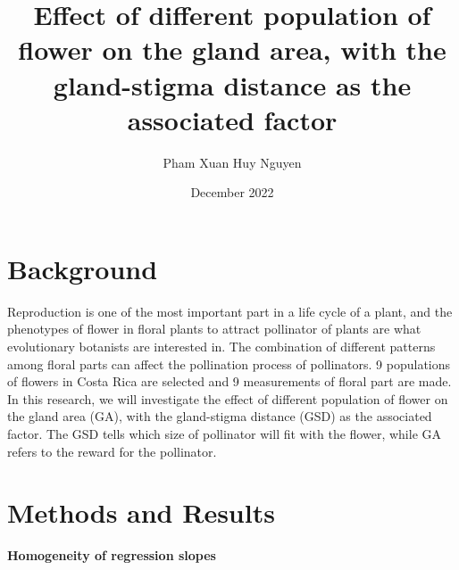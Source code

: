 \documentclass{article}
\title{Effect of different population of flower on the gland area, with the gland-stigma distance as the associated factor  }
\author{Pham Xuan Huy Nguyen}
\date{December 2022}
\begin{document}
\maketitle

\section{Background}

Reproduction is one of the most important part in a life cycle of a plant, and the phenotypes of flower in floral plants to attract pollinator of plants are what evolutionary botanists are interested in. The combination of different patterns among floral parts can affect the pollination process of pollinators. 9 populations of flowers in Costa Rica are selected and 9 measurements of floral part are made. In this research, we will investigate the effect of different population of flower on the gland area (GA), with the gland-stigma distance (GSD) as the associated factor. The GSD tells which size of pollinator will fit with the flower, while GA refers to the reward for the pollinator.

\section{Methods and Results}
\textbf{Homogeneity of regression slopes\\}
\end{document}
